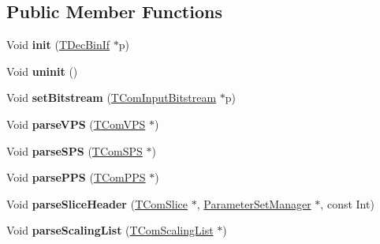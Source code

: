 \subsection*{Public Member Functions}
\begin{DoxyCompactItemize}
\item 
\mbox{\label{class_t_dec_sbac_a4b83e2289bec8ff2eefb26d0dcbb1d9f}} 
Void {\bfseries init} (\hyperlink{class_t_dec_bin_if}{T\+Dec\+Bin\+If} $\ast$p)
\item 
\mbox{\label{class_t_dec_sbac_ad05c42c895b94c90f3124ee70643b5c0}} 
Void {\bfseries uninit} ()
\item 
\mbox{\label{class_t_dec_sbac_a6a8aca527c73c314599b627e7025f6a7}} 
Void {\bfseries set\+Bitstream} (\hyperlink{class_t_com_input_bitstream}{T\+Com\+Input\+Bitstream} $\ast$p)
\item 
\mbox{\label{class_t_dec_sbac_ab981867046985f7cd118608a5c6d8f02}} 
Void {\bfseries parse\+V\+PS} (\hyperlink{class_t_com_v_p_s}{T\+Com\+V\+PS} $\ast$)
\item 
\mbox{\label{class_t_dec_sbac_a0396c513300a41e626fda40204a39e50}} 
Void {\bfseries parse\+S\+PS} (\hyperlink{class_t_com_s_p_s}{T\+Com\+S\+PS} $\ast$)
\item 
\mbox{\label{class_t_dec_sbac_aedada8529fe182fad6b426c70381ea94}} 
Void {\bfseries parse\+P\+PS} (\hyperlink{class_t_com_p_p_s}{T\+Com\+P\+PS} $\ast$)
\item 
\mbox{\label{class_t_dec_sbac_a6d665c37dea9c40c1dd1bb86078009bb}} 
Void {\bfseries parse\+Slice\+Header} (\hyperlink{class_t_com_slice}{T\+Com\+Slice} $\ast$, \hyperlink{class_parameter_set_manager}{Parameter\+Set\+Manager} $\ast$, const Int)
\item 
\mbox{\label{class_t_dec_sbac_af0d4e973fc11d3df2c1a43b649180de8}} 
Void {\bfseries parse\+Scaling\+List} (\hyperlink{class_t_com_scaling_list}{T\+Com\+Scaling\+List} $\ast$)
\end{DoxyCompactItemize}
